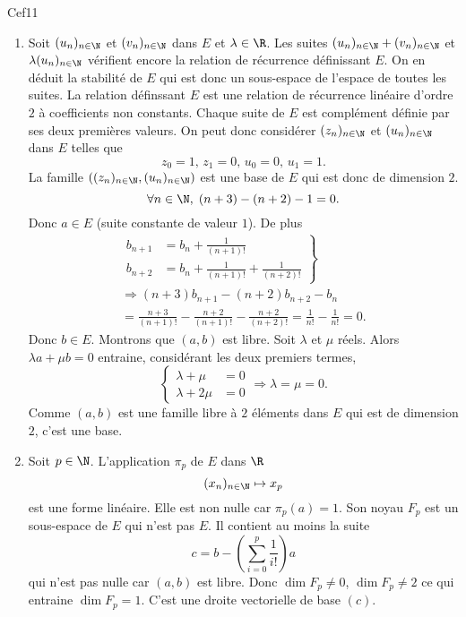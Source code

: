 \begin{tiny}Cef11\end{tiny}
\begin{enumerate}
  \item Soit $(u_n)_{n\in \N}$ et $(v_n)_{n\in \N}$ dans $E$ et $\lambda \in \R$. Les suites $(u_n)_{n\in \N} + (v_n)_{n\in \N}$ et $\lambda(u_n)_{n\in \N}$ vérifient encore la relation de récurrence définissant $E$. On en déduit la stabilité de $E$ qui est donc un sous-espace de l'espace de toutes les suites.\newline
  La relation définssant $E$ est une relation de récurrence linéaire d'ordre $2$ à coefficients non constants. Chaque suite de $E$ est complément définie par ses deux premières valeurs. On peut donc considérer $(z_n)_{n\in \N}$ et $(u_n)_{n\in \N}$ dans $E$ telles que 
\[
  z_0 = 1, \, z_1 = 0, \, u_0 = 0, \, u_1 = 1.
\]
La famille $\left((z_n)_{n\in \N},(u_n)_{n\in \N}\right)$ est une base de $E$ qui est donc de dimension $2$.
\[
  \forall n \in \N, \; (n+3) - (n+2) -1 =0.
\]
Donc $a\in E$ (suite constante de valeur $1$). De plus
\begin{multline*}
  \left.
  \begin{aligned}
    b_{n+1} &= b_n + \frac{1}{(n+1)!} \\ b_{n+2} &= b_n + \frac{1}{(n+1)!} + \frac{1}{(n+2)!}
  \end{aligned}
\right\rbrace \\
\Rightarrow
(n+3)b_{n+1} -(n+2)b_{n+2} - b_n \\
= \frac{n+3}{(n+1)!} - \frac{n+2}{(n+1)!} -\frac{n+2}{(n+2)!}
= \frac{1}{n!} - \frac{1}{n!} = 0 .
\end{multline*}
Donc $b \in E$. Montrons que $(a,b)$ est libre. Soit $\lambda$ et $\mu$ réels. Alors $\lambda a + \mu b = 0$ entraine, considérant les deux premiers termes,
\[
  \left\lbrace
  \begin{aligned}
    \lambda + \mu &= 0 \\ \lambda + 2\mu &= 0
  \end{aligned}
\right.
\Rightarrow \lambda = \mu = 0.
\]
Comme $(a,b)$ est une famille libre à $2$ éléments dans $E$ qui est de dimension $2$, c'est une base.
  \item Soit $p \in \N$. L'application $\pi_p$ de $E$ dans $\R$
  \[
    (x_n)_{n\in \N} \mapsto x_p
  \]
est une forme linéaire. Elle est non nulle car $\pi_p(a) = 1$. Son noyau $F_p$ est un sous-espace de $E$ qui n'est pas $E$. Il contient au moins la suite 
\[
  c = b - \left(\sum_{i=0}^p\frac{1}{i!}\right)a
\]
qui n'est pas nulle car $(a,b)$ est libre. Donc $\dim F_p \neq 0$, $\dim F_p \neq 2$ ce qui entraine $\dim F_p = 1$. C'est une droite vectorielle de base $(c)$. 
\end{enumerate}
